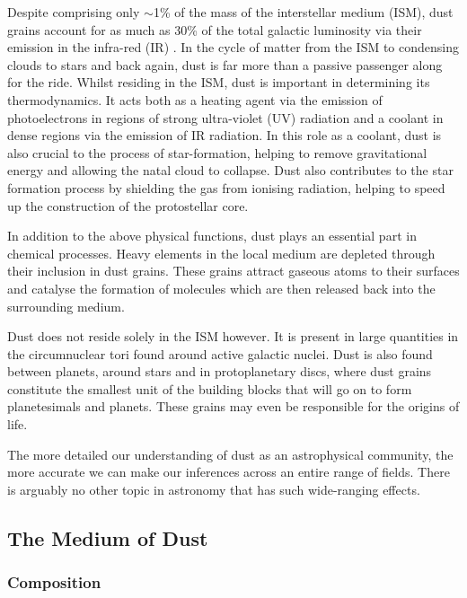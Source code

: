 Despite comprising only $\sim$1\% of the mass of the interstellar medium (ISM), dust grains account for as much as 30\% of the total galactic luminosity via their emission in the infra-red (IR) \citep{Li2003}.  In the cycle of matter from the ISM to condensing clouds to stars and back again, dust is far more than a passive passenger along for the ride.  Whilst residing in the ISM, dust is important in determining its thermodynamics.  It acts both as a heating agent via the emission of photoelectrons in regions of strong ultra-violet (UV) radiation and a coolant in dense regions via the emission of IR radiation.  In this role as a coolant, dust is also crucial to the process of star-formation, helping to remove gravitational energy and allowing the natal cloud to collapse.  Dust also contributes to the star formation process by shielding the gas from ionising radiation, helping to speed up the construction of the protostellar core. 

In addition to the above physical functions, dust plays an essential part in chemical processes.  Heavy elements in the local medium are depleted through their inclusion in dust grains.  These grains  attract gaseous atoms to their surfaces and catalyse the formation of molecules which are then released back into the surrounding medium.

Dust does not reside solely in the ISM however.  It is present in  large quantities in the circumnuclear tori found around active galactic nuclei.  Dust is also found between planets, around stars and in protoplanetary discs, where dust grains constitute the smallest unit of the building blocks that will go on to form planetesimals and planets.  These grains may even be responsible for the origins of life.  

The more detailed our understanding of dust as an astrophysical community, the more accurate we can make our inferences across an entire range of  fields.  There is arguably no other topic in astronomy that has such wide-ranging effects.


\subsection{The Medium of Dust}

\subsubsection{Composition}

